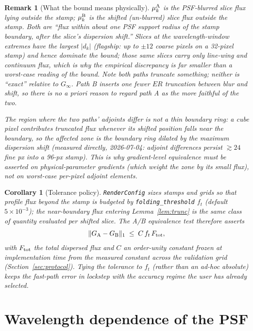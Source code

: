 \documentclass[11pt]{article}
\newtheorem{remark}{Remark}
\newtheorem{corollary}{Corollary}
\newcommand{\code}[1]{\texttt{#1}}
\begin{document}
\begin{remark}[What the bound means physically]
$\mu_k^{\rm A}$ is the PSF-blurred slice flux lying outside the stamp;
$\mu_k^{\rm B}$ is the shifted (un-blurred) slice flux outside the stamp.
Both are ``flux within about one PSF support radius of the stamp boundary,
after the slice's dispersion shift.'' Slices at the wavelength-window
extremes have the largest $|d_k|$ (flagship: up to $\pm12$ coarse pixels on a
32-pixel stamp) and hence dominate the bound; those same slices carry only
line-wing and continuum flux, which is why the empirical discrepancy is far
smaller than a worst-case reading of the bound. Note both paths truncate
\emph{something}; neither is ``exact'' relative to $G_\infty$. Path B inserts
one fewer $E R$ truncation between blur and shift, so there is no a priori
reason to regard path A as the more faithful of the two.

The region where the two paths' \emph{adjoints} differ is not a thin
boundary ring: a cube pixel contributes truncated flux whenever its
\emph{shifted} position falls near the boundary, so the affected zone is
the boundary ring dilated by the maximum dispersion shift (measured
directly, 2026-07-04: adjoint differences persist $\gtrsim24$ fine px into
a 96-px stamp). This is why gradient-level equivalence must be asserted on
physical-parameter gradients (which weight the zone by its small flux),
not on worst-case per-pixel adjoint elements.
\end{remark}

\begin{corollary}[Tolerance policy]
\label{cor:tol}
\code{RenderConfig} sizes stamps and grids so that profile flux beyond the
stamp is budgeted by \code{folding\_threshold} $f_t$ (default
$5\times10^{-3}$); the near-boundary flux entering
Lemma~\ref{lem:trunc} is the same class of quantity evaluated per shifted
slice. The A/B equivalence test therefore asserts
\[
\| G_{\rm A} - G_{\rm B} \|_1 \;\le\; C\, f_t\, F_{\rm tot},
\]
with $F_{\rm tot}$ the total dispersed flux and $C$ an order-unity constant
frozen at implementation time from the measured constant across the
validation grid (Section~\ref{sec:protocol}). Tying the tolerance to $f_t$
(rather than an ad-hoc absolute) keeps the fast-path error in lockstep with
the accuracy regime the user has already selected.
\end{corollary}

\section{Wavelength dependence of the PSF}
\label{sec:lambda}
\end{document}
